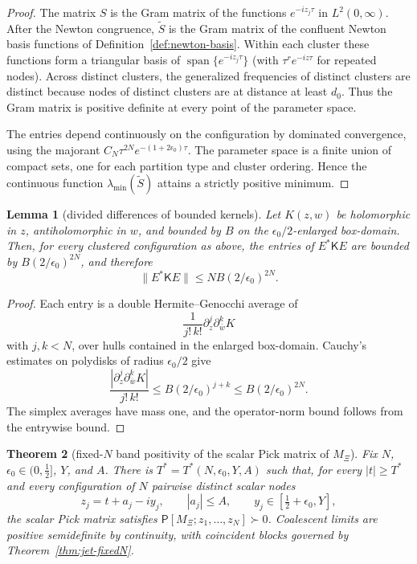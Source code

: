 \documentclass[11pt]{amsart}
\newtheorem{theorem}{Theorem}[section]
\newtheorem{lemma}[theorem]{Lemma}
\theoremstyle{definition}
\theoremstyle{remark}
\theoremstyle{definition}
\newcommand{\half}{\tfrac{1}{2}}
\begin{document}
\begin{proof}
The matrix $S$ is the Gram matrix of the functions $e^{-iz_j\tau}$ in $L^2(0,\infty)$.  After the
Newton congruence, $\widetilde S$ is the Gram matrix of the confluent Newton basis functions of
Definition~\ref{def:newton-basis}.  Within each cluster these functions form a triangular basis of
$\operatorname{span}\{e^{-iz_j\tau}\}$ (with $\tau^re^{-iz\tau}$ for repeated nodes).  Across distinct clusters, the
generalized frequencies of distinct clusters are distinct because nodes of distinct clusters are at
distance at least $d_0$.
Thus the Gram matrix is positive definite at every point of the parameter space.

The entries depend continuously on the configuration by dominated convergence, using the majorant
$C_N\tau^{2N}e^{-(1+2\epsilon_0)\tau}$.  The parameter space is a finite union of compact sets, one
for each partition type and cluster ordering.  Hence the continuous function
$\lambda_{\min}(\widetilde S)$ attains a strictly positive minimum.
\end{proof}

\begin{lemma}[divided differences of bounded kernels]\label{lem:dd-bounded}
Let $K(z,w)$ be holomorphic in $z$, antiholomorphic in $w$, and bounded by $B$ on the
$\epsilon_0/2$-enlarged box-domain.  Then, for every clustered configuration as above, the entries of
$E^*\mathsf K E$ are bounded by $B(2/\epsilon_0)^{2N}$, and therefore
\[
   \|E^*\mathsf K E\|\le NB(2/\epsilon_0)^{2N}.
\]
\end{lemma}

\begin{proof}
Each entry is a double Hermite--Genocchi average of
\[
   \frac{1}{j!\,k!}\partial_z^j\partial_{\bar w}^kK
\]
with $j,k<N$, over hulls contained in the enlarged box-domain.  Cauchy's estimates on polydisks of
radius $\epsilon_0/2$ give
\[
   \frac{|\partial_z^j\partial_{\bar w}^kK|}{j!\,k!}
   \le B(2/\epsilon_0)^{j+k}
   \le B(2/\epsilon_0)^{2N}.
\]
The simplex averages have mass one, and the operator-norm bound follows from the entrywise bound.
\end{proof}

\begin{theorem}[fixed-$N$ band positivity of the scalar Pick matrix of $M_\Xi$]\label{thm:band-closure}
Fix $N$, $\epsilon_0\in(0,\half]$, $Y$, and $A$.  There is
$T^*=T^*(N,\epsilon_0,Y,A)$ such that, for every $|t|\ge T^*$ and every configuration of $N$ pairwise
distinct scalar nodes
\[
   z_j=t+a_j-iy_j,\qquad |a_j|\le A,\qquad y_j\in[\half+\epsilon_0,Y],
\]
the scalar Pick matrix satisfies $\mathsf P[M_\Xi;z_1,\ldots,z_N]\succ0$.  Coalescent limits are
positive semidefinite by continuity, with coincident blocks governed by Theorem~\ref{thm:jet-fixedN}.
\end{theorem}
\end{document}
